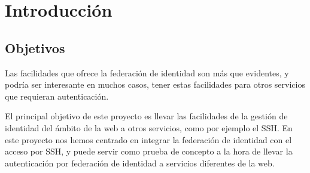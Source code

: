 
\chapter{Introducción}
\section{Objetivos}

Las facilidades que ofrece la federación de identidad son más que
evidentes, y podría ser interesante en muchos casos, tener estas
facilidades para otros servicios que requieran autenticación.

El principal objetivo de este proyecto es llevar las facilidades de la
gestión de identidad del ámbito de la web a otros servicios, como por
ejemplo el SSH. En este proyecto nos hemos centrado en integrar la
federación de identidad con el acceso por SSH, y puede servir como
prueba de concepto a la hora de llevar la autenticación por federación
de identidad a servicios diferentes de la web.

